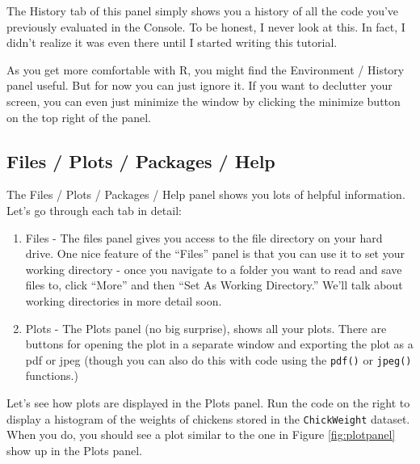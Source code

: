 \documentclass[
]{book}
\newenvironment{Shaded}{\begin{snugshade}}{\end{snugshade}}
\newcommand{\DataTypeTok}[1]{\textcolor[rgb]{0.13,0.29,0.53}{#1}}
\newcommand{\KeywordTok}[1]{\textcolor[rgb]{0.13,0.29,0.53}{\textbf{#1}}}
\newcommand{\NormalTok}[1]{#1}
\newcommand{\OperatorTok}[1]{\textcolor[rgb]{0.81,0.36,0.00}{\textbf{#1}}}
\newcommand{\StringTok}[1]{\textcolor[rgb]{0.31,0.60,0.02}{#1}}
\begin{document}
The History tab of this panel simply shows you a history of all the code you've previously evaluated in the Console. To be honest, I never look at this. In fact, I didn't realize it was even there until I started writing this tutorial.

As you get more comfortable with R, you might find the Environment / History panel useful. But for now you can just ignore it. If you want to declutter your screen, you can even just minimize the window by clicking the minimize button on the top right of the panel.

\hypertarget{files-plots-packages-help}{%
\subsection{Files / Plots / Packages / Help}\label{files-plots-packages-help}}

The Files / Plots / Packages / Help panel shows you lots of helpful information. Let's go through each tab in detail:

\begin{enumerate}
\def\labelenumi{\arabic{enumi}.}
\item
  Files - The files panel gives you access to the file directory on your hard drive. One nice feature of the ``Files'' panel is that you can use it to set your working directory - once you navigate to a folder you want to read and save files to, click ``More'' and then ``Set As Working Directory.'' We'll talk about working directories in more detail soon.
\item
  Plots - The Plots panel (no big surprise), shows all your plots. There are buttons for opening the plot in a separate window and exporting the plot as a pdf or jpeg (though you can also do this with code using the \texttt{pdf()} or \texttt{jpeg()} functions.)
\end{enumerate}

Let's see how plots are displayed in the Plots panel. Run the code on the right to display a histogram of the weights of chickens stored in the \texttt{ChickWeight} dataset. When you do, you should see a plot similar to the one in Figure \ref{fig:plotpanel} show up in the Plots panel.

\begin{Shaded}
\end{Shaded}
\end{document}
